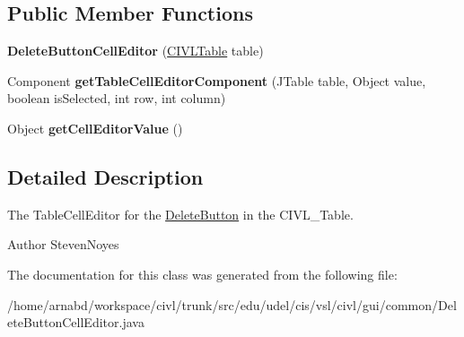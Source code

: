 \subsection*{Public Member Functions}
\begin{DoxyCompactItemize}
\item 
\hypertarget{classedu_1_1udel_1_1cis_1_1vsl_1_1civl_1_1gui_1_1common_1_1DeleteButtonCellEditor_a3b1deb9143fd1fdaffe2deee0ed4ca25}{}{\bfseries Delete\+Button\+Cell\+Editor} (\hyperlink{classedu_1_1udel_1_1cis_1_1vsl_1_1civl_1_1gui_1_1common_1_1CIVLTable}{C\+I\+V\+L\+Table} table)\label{classedu_1_1udel_1_1cis_1_1vsl_1_1civl_1_1gui_1_1common_1_1DeleteButtonCellEditor_a3b1deb9143fd1fdaffe2deee0ed4ca25}

\item 
\hypertarget{classedu_1_1udel_1_1cis_1_1vsl_1_1civl_1_1gui_1_1common_1_1DeleteButtonCellEditor_a57175aa7f4bc2252ec08d5a6da8658c0}{}Component {\bfseries get\+Table\+Cell\+Editor\+Component} (J\+Table table, Object value, boolean is\+Selected, int row, int column)\label{classedu_1_1udel_1_1cis_1_1vsl_1_1civl_1_1gui_1_1common_1_1DeleteButtonCellEditor_a57175aa7f4bc2252ec08d5a6da8658c0}

\item 
\hypertarget{classedu_1_1udel_1_1cis_1_1vsl_1_1civl_1_1gui_1_1common_1_1DeleteButtonCellEditor_a48c234e4301b3889f7092bc35bf5250a}{}Object {\bfseries get\+Cell\+Editor\+Value} ()\label{classedu_1_1udel_1_1cis_1_1vsl_1_1civl_1_1gui_1_1common_1_1DeleteButtonCellEditor_a48c234e4301b3889f7092bc35bf5250a}

\end{DoxyCompactItemize}


\subsection{Detailed Description}
The Table\+Cell\+Editor for the \hyperlink{classedu_1_1udel_1_1cis_1_1vsl_1_1civl_1_1gui_1_1common_1_1DeleteButton}{Delete\+Button} in the C\+I\+V\+L\+\_\+\+Table. 

\begin{DoxyAuthor}{Author}
Steven\+Noyes 
\end{DoxyAuthor}


The documentation for this class was generated from the following file\+:\begin{DoxyCompactItemize}
\item 
/home/arnabd/workspace/civl/trunk/src/edu/udel/cis/vsl/civl/gui/common/Delete\+Button\+Cell\+Editor.\+java\end{DoxyCompactItemize}
